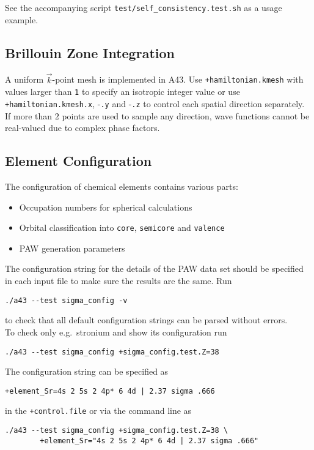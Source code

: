 \documentclass[oribibl]{llncs}
\newcommand{\ttt}[1]{\texttt{#1}}
\newcommand{\codename}{A43}
\begin{document}
\noindent
See the accompanying script \ttt{test/self\_consistency.test.sh} as a usage example.

\subsection{Brillouin Zone Integration} \label{sec:brillouin-zone}
%
A uniform $\vec k$-point mesh is implemented in \codename{}.
Use \ttt{+hamiltonian.kmesh} with values larger than \ttt{1} to
specify an isotropic integer value or use
\ttt{+hamiltonian.kmesh.x}, -\ttt{.y} and -\ttt{.z} 
to control each spatial direction separately.
If more than $2$ points are used to sample any direction,
wave functions cannot be real-valued due to complex phase factors.
%
%

\subsection{Element Configuration} \label{sec:sigma-config}
%
The configuration of chemical elements contains various parts:
\begin{itemize}
  \item Occupation numbers for spherical calculations
  \item Orbital classification into \ttt{core}, \ttt{semicore} and \ttt{valence}
  \item \ac{PAW} generation parameters
\end{itemize}
%
\noindent
The configuration string for the details of the \ac{PAW} data set should be 
specified in each input file to make sure the results are the same. Run
\begin{verbatim}
./a43 --test sigma_config -v
\end{verbatim}
to check that all default configuration strings can be parsed without errors.
\\
To check only e.g.~stronium and show its configuration run
\begin{verbatim}
./a43 --test sigma_config +sigma_config.test.Z=38
\end{verbatim}
The configuration string can be specified as
\begin{verbatim}
+element_Sr=4s 2 5s 2 4p* 6 4d | 2.37 sigma .666
\end{verbatim}
in the \ttt{+control.file} or via the command line as
\begin{verbatim}
./a43 --test sigma_config +sigma_config.test.Z=38 \
        +element_Sr="4s 2 5s 2 4p* 6 4d | 2.37 sigma .666"
\end{verbatim}
\end{document}
